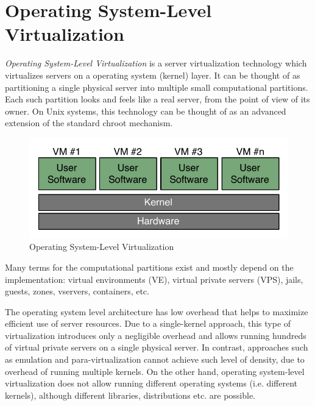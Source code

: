\section{Operating System-Level Virtualization}
\label{sec:intro:intro:oslevel}

\textit{Operating System-Level Virtualization} is a server virtualization
technology which virtualizes servers on a operating system (kernel) layer. It
can be thought of as partitioning a single physical server into multiple small
computational partitions. Each such partition looks and feels like a real
server, from the point of view of its owner. On Unix systems, this technology
can be thought of as an advanced extension of the standard chroot mechanism.

\begin{figure}[H]
	\center
	\includegraphics[scale=0.75]{intro/os-virtualization}
	\caption{Operating System-Level Virtualization}
\end{figure}

Many terms for the computational partitions exist and mostly depend on the
implementation: virtual environments (VE), virtual private servers (VPS),
jails, guests, zones, vservers, containers, etc.

The operating system level architecture has low overhead that helps to maximize
efficient use of server resources. Due to a single-kernel approach, this type
of virtualization introduces only a negligible overhead and allows running
hundreds of virtual private servers on a single physical server. In contrast,
approaches such as emulation and para-virtualization cannot achieve such level
of density, due to overhead of running multiple kernels. On the other hand,
operating system-level virtualization does not allow running different
operating systems (i.e. different kernels), although different libraries,
distributions etc. are possible.~\cite{wp-os-virt}
